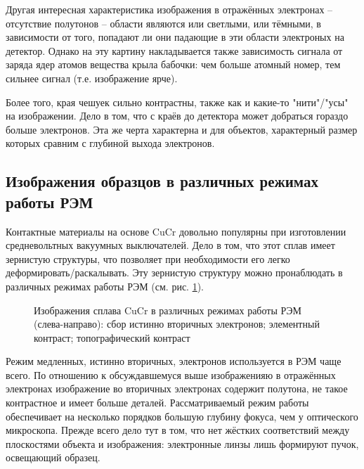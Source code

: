 \documentclass[a4paper,12pt]{article}	%
\begin{document}
\medskip

\noindent Другая интересная характеристика изображения в отражённых электронах -- отсутствие полутонов -- области являются или светлыми, или тёмными, в зависимости от того, попадают ли они падающие в эти области электроных на детектор. Однако на эту картину накладывается также зависимость сигнала от заряда ядер атомов вещества крыла бабочки: чем больше атомный номер, тем сильнее сигнал (т.е. изображение ярче).

\medskip

\noindent Более того, края чешуек сильно контрастны, также как и какие-то "нити"/"усы" на изображении. Дело в том, что с краёв до детектора может добраться гораздо больше электронов. Эта же черта характерна и для объектов, характерный размер которых сравним с глубиной выхода электронов.

    \subsection{Изображения образцов в различных режимах работы РЭМ}

\noindent Контактные материалы на основе CuCr довольно популярны при изготовлении средневольтных вакуумных выключателей. Дело в том, что этот сплав имеет зернистую структуры, что позволяет при необходимости его легко деформировать/раскалывать. Эту зернистую структуру можно пронаблюдать в различных режимах работы РЭМ (см. рис. \ref{CuCr}).

\medskip

        \begin{figure}
    	\caption{Изображения сплава CuCr в различных режимах работы РЭМ (слева-направо): сбор истинно вторичных электронов; элементный контраст; топографический контраст}
    	\label{CuCr}
	\end{figure}

\noindent Режим медленных, истинно вторичных, электронов используется в РЭМ чаще всего. По отношению к обсуждавшемуся выше изображенияю в отражённых электронах изображение во вторичных электронах содержит полутона, не такое контрастное и имеет больше деталей. Рассматриваемый режим работы обеспечивает на несколько порядков большую глубину фокуса, чем у оптического микроскопа. Прежде всего дело тут в том, что нет жёстких соответствий между плоскостями объекта и изображения: электронные линзы лишь формируют пучок, освещающий образец.
\end{document}
